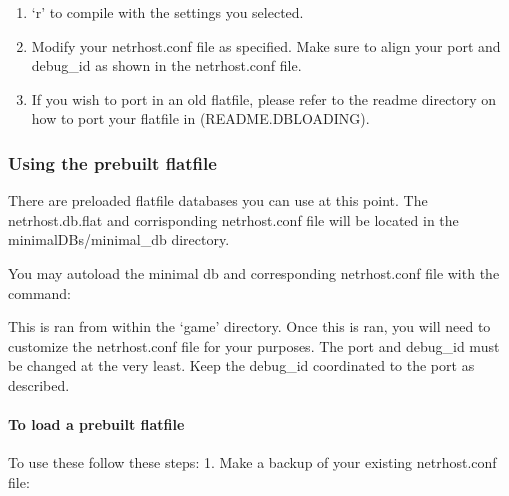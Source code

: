 \documentclass[letterpaper,10pt,english]{sphinxmanual}
\begin{document}
\begin{enumerate}
%
\item {} 
\sphinxAtStartPar
‘r’ to compile with the settings you selected.

\item {} 
\sphinxAtStartPar
Modify your netrhost.conf file as specified.  Make sure to align your port and debug\_id as shown in the netrhost.conf file.

\item {} 
\sphinxAtStartPar
If you wish to port in an old flatfile, please refer to the readme directory on how to port your flatfile in (README.DBLOADING).

\end{enumerate}


\subsubsection{Using the prebuilt flatfile}
\label{\detokenize{installation:using-the-prebuilt-flatfile}}
\sphinxAtStartPar
There are pre\sphinxhyphen{}loaded flatfile databases you can use at this point.  The netrhost.db.flat
and corrisponding netrhost.conf file will be located in the minimal\sphinxhyphen{}DBs/minimal\_db directory.

\sphinxAtStartPar
You may auto\sphinxhyphen{}load the minimal db and corresponding netrhost.conf file with the command:

\begin{sphinxVerbatim}[commandchars=\\\{\}]
\end{sphinxVerbatim}

\sphinxAtStartPar
This is ran from within the ‘game’ directory.  Once this is ran, you will need
to customize the netrhost.conf file for your purposes.  The port and debug\_id must
be changed at the very least.  Keep the debug\_id coordinated to the port as described.


\paragraph{To load a prebuilt flatfile}
\label{\detokenize{installation:to-load-a-prebuilt-flatfile}}
\sphinxAtStartPar
To use these follow these steps:
1.  Make a backup of your existing netrhost.conf file:
\end{document}
